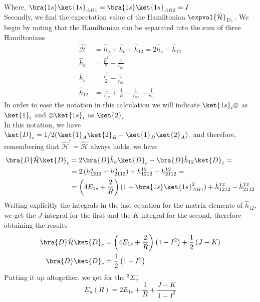 \documentclass[a4paper, 11pt]{book}
\newcommand{\1}{\opr{\mathds{1}}}
\newcommand{\ham}{\mathcal{H}}
\newcommand{\opr}[1]{\hat{#1}}
\newcommand{\adj}[2][]{#2^{\dagger#1}}
\newcommand{\term}[3][]{^{#3}#2_{#1}}
\theoremstyle{plain}
\begin{document}
	Where, $\bra{1s}\ket{1s}_{AB1}=\bra{1s}\ket{1s}_{AB2}=I$\\
	Secondly, we find the expectation value of the Hamiltonian $\expval{\opr{\ham}}_{D_c}$. We begin by noting that the Hamiltonian can be separated into the sum of three Hamiltonians
	\begin{equation*}
		\begin{aligned}
			\opr{\ham}&=\opr{h}_a+\opr{h}_b+\opr{h}_{12}=2\opr{h}_a-\opr{h}_{12}\\
			\opr{h}_a&=\frac{\opr{p}^2}{2}-\frac{1}{r_{a1}}\\
			\opr{h}_b&=\frac{\opr{p}^2}{2}-\frac{1}{r_{b2}}\\
			\opr{h}_{12}&=\frac{1}{r_{12}}+\frac{1}{R}-\frac{1}{r_{a2}}-\frac{1}{r_{b1}}
		\end{aligned}
	\end{equation*}
	In order to ease the notation in this calculation we will indicate $\ket{1s}_i\otimes$ as $\ket{1}_i$ and $\otimes\ket{1s}_i$ as $\ket{2}_i$\\
	In this notation, we have $\ket{D}_c=1/2(\ket{1}_A\ket{2}_B-\ket{1}_B\ket{2}_A)$, and therefore, remembering that $\adj{\opr{\ham}}=\opr{\ham}$ always holds, we have
	\begin{equation*}
		\begin{aligned}
			\bra{D}\opr{\ham}\ket{D}_c&=2\bra{D}\opr{h}_a\ket{D}_c-\bra{D}\opr{h}_{12}\ket{D}_c=\\
			&=2\left(h^a_{1212}+h^a_{2112}\right)+h^{12}_{1212}-h^{12}_{2112}=\\
			&=\left(4E_{1s}+\frac{2}{R}\right)(1-\bra{1s}\ket{1s}_{AB1}^2)+\opr{h}^{12}_{1212}-\opr{h}^{12}_{2112}
		\end{aligned}
	\end{equation*}
	Writing explicitly the integrals in the last equation for the matrix elements of $\opr{h}_{12}$, we get the $J$ integral for the first and the $K$ integral for the second, therefore obtaining the results
	\begin{equation}
		\begin{aligned}
			\bra{D}\opr{\ham}\ket{D}_c&=\left( 4E_{1s}+\frac{2}{R} \right)\left( 1-I^2 \right)+\frac{1}{2}\left(J-K\right)\\
			\bra{D}\ket{D}_c&=\frac{1}{2}\left( 1-I^2 \right)\\
		\end{aligned}
		\label{eq:valencebondketd}
	\end{equation}
	Putting it up altogether, we get for the $\term[u]{\Sigma^+}{3}$
	\begin{equation}
		E_u(R)=2E_{1s}+\frac{1}{R}+\frac{J-K}{1-I^2}
		\label{eq:ungeradeenergyketd}
	\end{equation}
\end{document}
